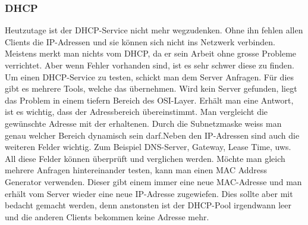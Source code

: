 \documentclass[a4,12pt]{scrartcl}
\begin{document}
\subsubsection{DHCP}
Heutzutage ist der DHCP-Service nicht mehr wegzudenken. Ohne ihn fehlen allen Clients die IP-Adressen und sie können sich nicht ins Netzwerk verbinden. Meistens merkt man nichts vom DHCP, da er sein Arbeit ohne grosse Probleme verrichtet. Aber wenn Fehler vorhanden sind, ist es sehr schwer diese zu finden. \newline\newline
Um einen DHCP-Service zu testen, schickt man dem Server Anfragen. Für dies gibt es mehrere Tools, welche das übernehmen. Wird kein Server gefunden, liegt das Problem in einem tiefern Bereich des OSI-Layer.\newline
Erhält man eine Antwort, ist es wichtig, dass der Adressbereich übereinstimmt. Man vergleicht die gewünschte Adresse mit der erhaltenen. Durch die Subnetzmaske weiss man genau welcher Bereich dynamisch sein darf.\newline\newline Neben den IP-Adressen sind auch die weiteren Felder wichtig. Zum Beispiel DNS-Server, Gateway, Lease Time, uws. All diese Felder können überprüft und verglichen werden.\newline\newline
Möchte man gleich mehrere Anfragen hintereinander testen, kann man einen MAC Address Generator verwenden. Dieser gibt einem immer eine neue MAC-Adresse und man erhält vom Server wieder eine neue IP-Adresse zugewiefen. Dies sollte aber mit bedacht gemacht werden, denn anstonsten ist der DHCP-Pool irgendwann  leer und die anderen Clients bekommen keine Adresse mehr. 
\end{document}
